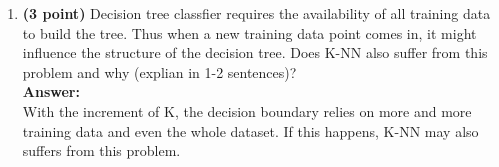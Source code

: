 \begin{enumerate}
	\item \textbf{(3 point)}
	Decision tree classfier requires the availability of all training data to build the tree. Thus when a new training data point comes in, it might influence the structure of the decision tree. Does K-NN also suffer from this problem and why (explian in 1-2 sentences)? 
	\\\textbf{Answer:}\\
	With the increment of K, the decision boundary relies on more and more training data and even the whole dataset. If this happens, K-NN may also suffers from this problem.
	
\end{enumerate}
\newpage
